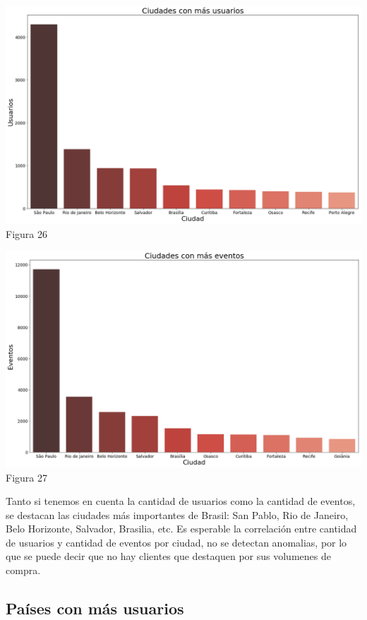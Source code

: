 \documentclass[a4paper ,12pt]{article}
\begin{document}
\begin{center}
	\includegraphics[width=1.1\linewidth]{output_95_0}
	Figura 26
	
\end{center}
\begin{center}
	\includegraphics[width=1.1\linewidth]{output_97_0}
	Figura 27
	
\end{center}
Tanto si tenemos en cuenta la cantidad de usuarios como la cantidad de eventos, se destacan las ciudades más importantes de Brasil: San Pablo, Rio de Janeiro, Belo Horizonte, Salvador, Brasilia, etc. Es esperable la correlación entre cantidad de usuarios y cantidad de eventos por ciudad, no se detectan anomalias, por lo que se puede decir que no hay clientes que destaquen por sus volumenes de compra.

\newpage

\subsection{Países con más usuarios}
\end{document}
